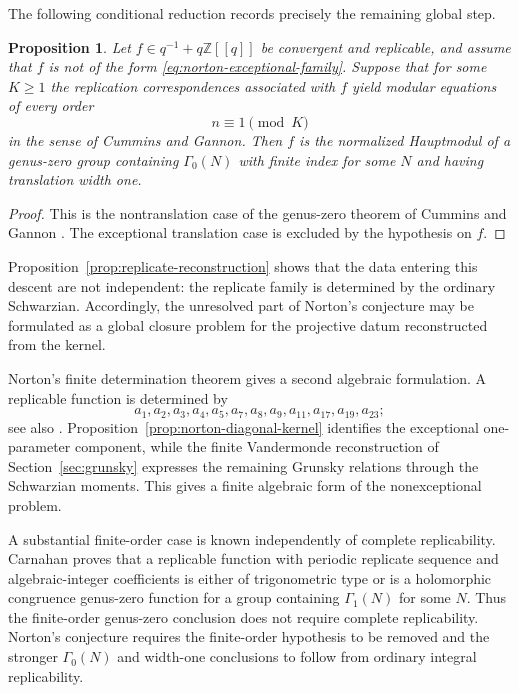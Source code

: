 \documentclass[11pt]{amsart}
\newtheorem{prop}[thm]{Proposition}
\theoremstyle{definition}
\theoremstyle{remark}
\numberwithin{equation}{section}
\begin{document}
The following conditional reduction records precisely the remaining global step.

\begin{prop}\label{prop:norton-kernel-descent-reduction}
Let $f\in q^{-1}+q\mathbb Z[[q]]$ be convergent and replicable, and assume that $f$ is not of the form \eqref{eq:norton-exceptional-family}. Suppose that for some $K\geq1$ the replication correspondences associated with $f$ yield modular equations of every order
\[
n\equiv1\pmod K
\]
in the sense of Cummins and Gannon. Then $f$ is the normalized Hauptmodul of a genus-zero group containing $\Gamma_0(N)$ with finite index for some $N$ and having translation width one.
\end{prop}

\begin{proof}
This is the nontranslation case of the genus-zero theorem of Cummins and Gannon \cite{cummins-gannon}. The exceptional translation case is excluded by the hypothesis on $f$.
\end{proof}

Proposition~\ref{prop:replicate-reconstruction} shows that the data entering this descent are not independent: the replicate family is determined by the ordinary Schwarzian. Accordingly, the unresolved part of Norton's conjecture may be formulated as a global closure problem for the projective datum reconstructed from the kernel.

Norton's finite determination theorem gives a second algebraic formulation. A replicable function is determined by
\[
a_1,a_2,a_3,a_4,a_5,a_7,a_8,a_9,a_{11},a_{17},a_{19},a_{23};
\]
see also \cite{cipu}. Proposition~\ref{prop:norton-diagonal-kernel} identifies the exceptional one-parameter component, while the finite Vandermonde reconstruction of Section~\ref{sec:grunsky} expresses the remaining Grunsky relations through the Schwarzian moments. This gives a finite algebraic form of the nonexceptional problem.

A substantial finite-order case is known independently of complete replicability. Carnahan \cite[Corollary~5.4]{carnahan} proves that a replicable function with periodic replicate sequence and algebraic-integer coefficients is either of trigonometric type or is a holomorphic congruence genus-zero function for a group containing $\Gamma_1(N)$ for some $N$. Thus the finite-order genus-zero conclusion does not require complete replicability. Norton's conjecture requires the finite-order hypothesis to be removed and the stronger $\Gamma_0(N)$ and width-one conclusions to follow from ordinary integral replicability.
\end{document}
